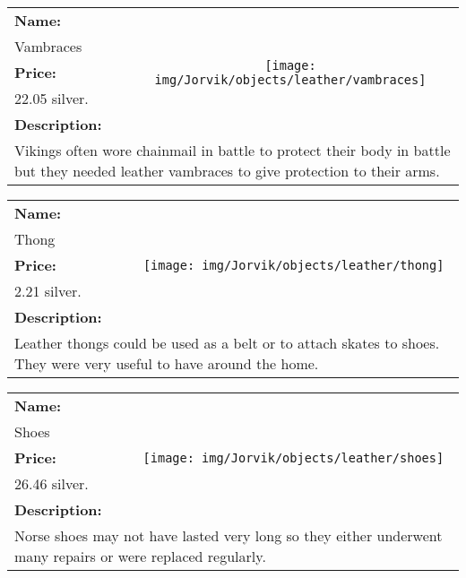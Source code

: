 \begin{table}[ht!]
	\centering
	\begin{tabular}{ p{3cm} c }\toprule
		\textbf{Name:} & \multirow{5}{*}{\texttt{[image: img/Jorvik/objects/leather/vambraces]}}\\
		Vambraces & \\ 
		\textbf{Price:} & \\
		22.05 silver. & \\ 
		\textbf{Description:} & \\
		\multicolumn{2}{p{12cm}}{Vikings often wore chainmail in battle to protect their body in battle but they needed leather vambraces to give protection to their arms.}\\
		\bottomrule
	\end{tabular}
\end{table}

\begin{table}[ht!]
	\centering
	\begin{tabular}{ p{3cm} c }\toprule
		\textbf{Name:} & \multirow{5}{*}{\texttt{[image: img/Jorvik/objects/leather/thong]}}\\
		Thong & \\ 
		\textbf{Price:} & \\
		2.21 silver. & \\ 
		\textbf{Description:} & \\
		\multicolumn{2}{p{12cm}}{Leather thongs could be used as a belt or to attach skates to shoes. They were very useful to have around the home.}\\
		\bottomrule
	\end{tabular}
\end{table}

\begin{table}[ht!]
	\centering
	\begin{tabular}{ p{3cm} c }\toprule
		\textbf{Name:} & \multirow{5}{*}{\texttt{[image: img/Jorvik/objects/leather/shoes]}}\\
		Shoes & \\ 
		\textbf{Price:} & \\
		26.46 silver. & \\ 
		\textbf{Description:} & \\
		\multicolumn{2}{p{12cm}}{Norse shoes may not have lasted very long so they either underwent many repairs or were replaced regularly. }\\
		\bottomrule
	\end{tabular}
\end{table}

